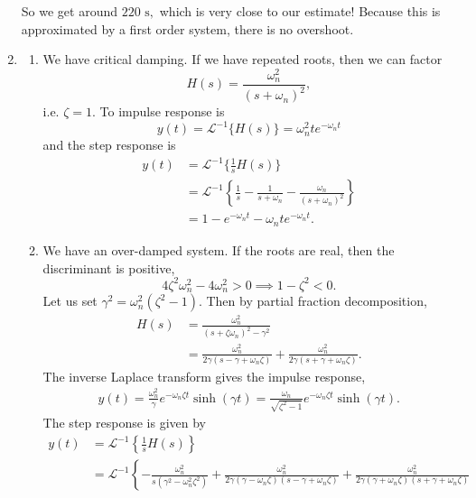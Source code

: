 \documentclass{article}
\numberwithin{equation}{section}
\begin{document}
\begin{enumerate}[label=\textbf{1.\arabic*}]
        So we get around $220\text{ s},$ which is very close to our estimate! Because this is approximated by a first order system, there is no overshoot.
\item \begin{enumerate}[label=(\alph*)]
    \item We have critical damping. If we have repeated roots, then we can factor
    \begin{equation}
        H(s) = \frac{\omega_n^2}{(s+\omega_n)^2},
    \end{equation}
    i.e. $\zeta = 1.$ To impulse response is 
    \begin{equation}
        y(t) = \mathcal{L}^{-1}\{H(s)\} = \omega_n^2 te^{-\omega_n t}
    \end{equation}
    and the step response is 
    \begin{align}
        y(t) &= \mathcal{L}^{-1}\{\frac{1}{s}H(s)\} \\ 
        &= \mathcal{L}^{-1}\left\{\frac{1}{s} - \frac{1}{s+\omega_n} - \frac{\omega_n}{(s+\omega_n)^2}\right\} \\ 
        &= 1 - e^{-\omega_n t} - \omega_n te^{-\omega_n t}.
    \end{align}
    \item We have an over-damped system. If the roots are real, then the discriminant is positive,
    \begin{equation}
        4\zeta^2\omega_n^2-4\omega_n^2 > 0 \implies 1-\zeta^2 < 0.
    \end{equation}
    Let us set $\gamma^2 = \omega_n^2(\zeta^2-1).$ Then by partial fraction decomposition,
    \begin{align}
        H(s) &= \frac{\omega_n^2}{(s+\zeta \omega_n)^2 - \gamma^2} \\ 
        &= \frac{\omega_n^2}{2\gamma(s -\gamma  + \omega_n \zeta)} + \frac{\omega_n^2}{2\gamma(s +\gamma  + \omega_n \zeta)}.
    \end{align}
    The inverse Laplace transform gives the impulse response,
    \begin{align}
        y(t) = \frac{\omega_n^2}{\gamma}e^{-\omega_n\zeta t}\sinh(\gamma t) = \frac{\omega_n}{\sqrt{\zeta^2-1}}e^{-\omega_n\zeta t}\sinh(\gamma t).
    \end{align}
    The step response is given by 
    \begin{align}
        y(t) &= \mathcal{L}^{-1}\left\{\frac{1}{s}H(s)\right\} \\ 
        &= \mathcal{L}^{-1}\left\{
            -\frac{\omega_n^2}{s(\gamma^2-\omega_n^2\zeta^2)} + \frac{\omega_n^2}{2\gamma(\gamma - \omega_n\zeta)(s -\gamma + \omega_n \zeta)} + \frac{\omega_n^2}{2\gamma(\gamma + \omega_n\zeta)(s +\gamma + \omega_n \zeta)}

\end{align}
\end{enumerate}
\end{enumerate}
\end{document}
